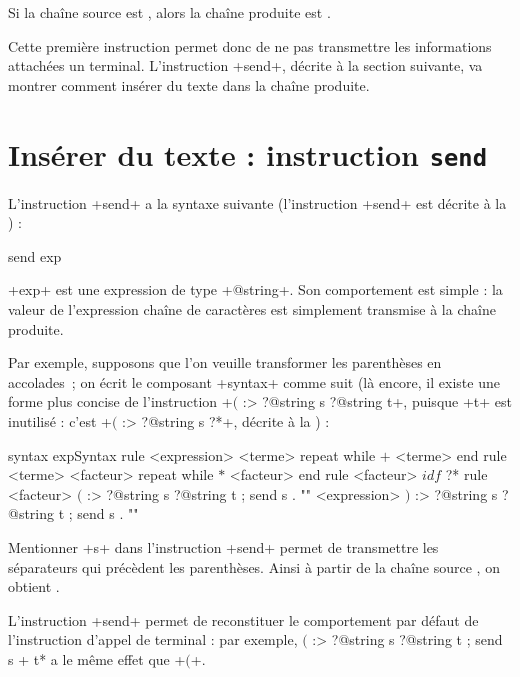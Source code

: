 Si la chaîne source est , alors la chaîne produite est .

Cette première instruction permet donc de ne pas transmettre les informations attachées un terminal. L'instruction \ggs+send+, décrite à la section suivante, va montrer comment insérer du texte dans la chaîne produite.










\section{Insérer du texte : instruction \texttt{send}}

L'instruction \ggs+send+ a la syntaxe suivante (l'instruction \ggs+send+ est décrite à la ) :

\begin{galgas}
send exp
\end{galgas}

\ggs+exp+ est une expression de type \ggs+@string+. Son comportement est simple : la valeur de l'expression chaîne de caractères est simplement transmise à la chaîne produite.

Par exemple, supposons que l'on veuille transformer les parenthèses en accolades~; on écrit le composant \ggs+syntax+ comme suit (là encore, il existe une forme plus concise de l'instruction \ggs+$($ :> ?@string s ?@string t+, puisque \ggs+t+ est inutilisé : c'est \ggs+$($ :> ?@string s ?*+, décrite  à la ) :
\begin{galgas}
syntax expSyntax {
  rule <expression> {
    <terme>
    repeat while $+$ <terme> end
  }
  rule <terme> {
    <facteur>
    repeat while $*$ <facteur> end
  }
  rule <facteur> {
    $idf$ ?*
  }
  rule <facteur> {
    $($ :> ?@string s ?@string t ; send s . "{"
    <expression>
    $)$ :> ?@string s ?@string t ; send s . "}"
  }
}
\end{galgas}

Mentionner \ggs+s+ dans l'instruction \ggs+send+ permet de transmettre les séparateurs qui précèdent les parenthèses. Ainsi à partir de la chaîne source , on obtient .


L'instruction \ggs+send+ permet de reconstituer le comportement par défaut de l'instruction d'appel de terminal : par exemple, \ggs*$($ :> ?@string s ?@string t ; send s + t* a le même effet que \ggs+$($+.


